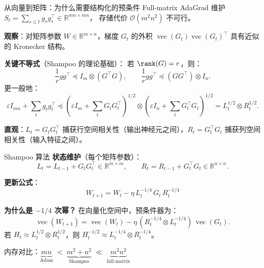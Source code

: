 \documentclass[aspectratio=169,10pt]{ctexbeamer}
\newcommand{\R}{\mathbb{R}}
\newcommand{\vect}{\operatorname{vec}}
\newcommand{\eps}{\varepsilon}
\begin{document}
\begin{frame}{从向量到矩阵：为什么需要结构化的预条件}
Full-matrix AdaGrad 维护 $S_t = \sum_{s\le t} g_s g_s^\top \in \R^{mn\times mn}$，
存储代价 $\mathcal{O}(m^2 n^2)$ 不可行。

\vspace{0.2cm}
\textbf{观察}：对矩阵参数 $W\in\R^{m\times n}$，梯度 $G_t$ 的外积 $\vect(G_t)\vect(G_t)^\top$ 具有近似的 Kronecker 结构。

\vspace{0.2cm}
\textbf{关键不等式}（Shampoo 的理论基础）：
若 $\rank(G)=r$，则：
\[
  \frac{1}{r} g g^\top \preceq I_m \otimes (G^\top G),\qquad
  \frac{1}{r} g g^\top \preceq (G G^\top) \otimes I_n.
\]
更一般地：
\[
  \eps I_{mn} + \sum_{t} g_t g_t^\top \preceq
  \left(\eps I_m + \sum_t G_t G_t^\top\right)^{1/2}
  \otimes
  \left(\eps I_n + \sum_t G_t^\top G_t\right)^{1/2}
  = L_t^{1/2} \otimes R_t^{1/2}.
\]

\vspace{0.2cm}
\textbf{直观}：$L_t=G_t G_t^\top$ 捕获行空间相关性（输出神经元之间），$R_t=G_t^\top G_t$ 捕获列空间相关性（输入特征之间）。
\end{frame}

\begin{frame}{Shampoo 算法}
\textbf{状态维护}（每个矩阵参数）：
\[
  L_t = L_{t-1} + G_t G_t^\top \in \R^{m\times m},\qquad
  R_t = R_{t-1} + G_t^\top G_t \in \R^{n\times n}.
\]

\vspace{0.2cm}
\textbf{更新公式}：
\[
  \boxed{W_{t+1} = W_t - \eta\,L_t^{-1/4}\,G_t\,R_t^{-1/4}}
\]

\vspace{0.2cm}
\textbf{为什么是 \(-1/4\) 次幂？}
在向量化空间中，预条件器为：
\[
  \vect(W_{t+1}) = \vect(W_t) - \eta\,(R_t^{-1/4}\otimes L_t^{-1/4})\,\vect(G_t).
\]
若 $H_t \approx L_t^{1/2}\otimes R_t^{1/2}$，则 $H_t^{-1/2}\approx L_t^{-1/4}\otimes R_t^{-1/4}$。

\vspace{0.2cm}
内存对比：$\underbrace{mn}_{\text{Adam}}\;<\;\underbrace{m^2+n^2}_{\text{Shampoo}}\;\ll\;\underbrace{m^2 n^2}_{\text{full-matrix}}$
\end{frame}
\end{document}
